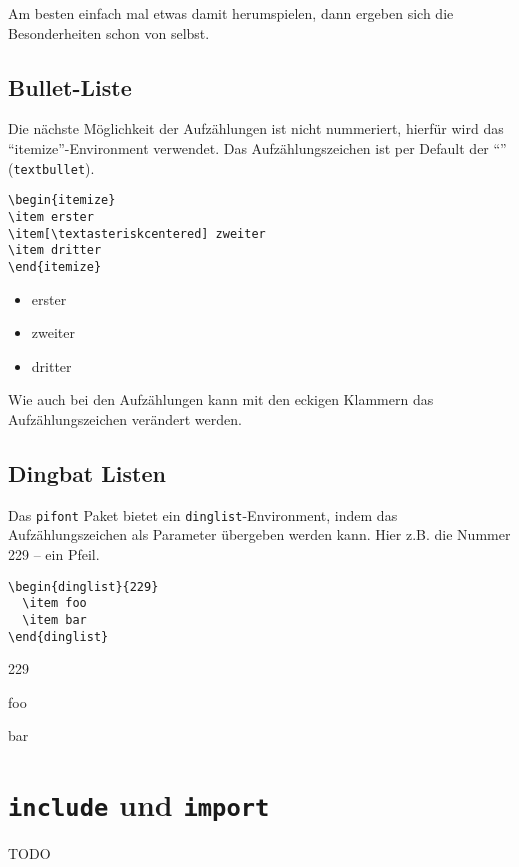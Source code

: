 Am besten einfach mal etwas damit herumspielen, dann ergeben sich die Besonderheiten schon von selbst.

\subsection{Bullet-Liste}

Die nächste Möglichkeit der Aufzählungen ist nicht nummeriert, hierfür wird das "`itemize"'-Environment verwendet. Das Aufzählungszeichen ist per Default der "`\textbullet"' (\texttt{textbullet}).
\begin{verbatim}
\begin{itemize}
\item erster
\item[\textasteriskcentered] zweiter
\item dritter
\end{itemize}
\end{verbatim}

\begin{itemize}
\item erster
\item[\textasteriskcentered] zweiter
\item dritter
\end{itemize}
Wie auch bei den Aufzählungen kann mit den eckigen Klammern das Aufzählungszeichen verändert werden. 

\subsection{Dingbat Listen}

Das \texttt{pifont} Paket bietet ein \texttt{dinglist}-Environment, indem das Aufzählungszeichen als Parameter übergeben werden kann. Hier z.B. die Nummer 229 -- ein Pfeil.

\begin{verbatim}
\begin{dinglist}{229}
  \item foo
  \item bar
\end{dinglist}
\end{verbatim}

\begin{dinglist}{229}
  \item foo
  \item bar
\end{dinglist}

\section{\texttt{include} und \texttt{import}}\label{sect:import}

TODO